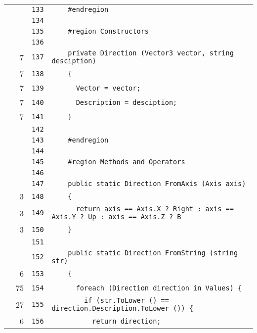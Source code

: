 \documentclass[a4paper,10pt]{article}
\begin{document}
\begin{longtable}[l]{lrrl}
\cellcolor{gray} &  & \verb~133~ & \verb~    #endregion~\\
\cellcolor{gray} &  & \verb~134~ & \verb~~\\
\cellcolor{gray} &  & \verb~135~ & \verb~    #region Constructors~\\
\cellcolor{gray} &  & \verb~136~ & \verb~~\\
\cellcolor{green} & 7 & \verb~137~ & \verb~    private Direction (Vector3 vector, string desciption)~\\
\cellcolor{green} & 7 & \verb~138~ & \verb~    {~\\
\cellcolor{green} & 7 & \verb~139~ & \verb~      Vector = vector;~\\
\cellcolor{green} & 7 & \verb~140~ & \verb~      Description = desciption;~\\
\cellcolor{green} & 7 & \verb~141~ & \verb~    }~\\
\cellcolor{gray} &  & \verb~142~ & \verb~~\\
\cellcolor{gray} &  & \verb~143~ & \verb~    #endregion~\\
\cellcolor{gray} &  & \verb~144~ & \verb~~\\
\cellcolor{gray} &  & \verb~145~ & \verb~    #region Methods and Operators~\\
\cellcolor{gray} &  & \verb~146~ & \verb~~\\
\cellcolor{gray} &  & \verb~147~ & \verb~    public static Direction FromAxis (Axis axis)~\\
\cellcolor{green} & 3 & \verb~148~ & \verb~    {~\\
\cellcolor{green} & 3 & \verb~149~ & \verb~      return axis == Axis.X ? Right : axis == Axis.Y ? Up : axis == Axis.Z ? B~\\
\cellcolor{green} & 3 & \verb~150~ & \verb~    }~\\
\cellcolor{gray} &  & \verb~151~ & \verb~~\\
\cellcolor{gray} &  & \verb~152~ & \verb~    public static Direction FromString (string str)~\\
\cellcolor{green} & 6 & \verb~153~ & \verb~    {~\\
\cellcolor{green} & 75 & \verb~154~ & \verb~      foreach (Direction direction in Values) {~\\
\cellcolor{green} & 27 & \verb~155~ & \verb~        if (str.ToLower () == direction.Description.ToLower ()) {~\\
\cellcolor{green} & 6 & \verb~156~ & \verb~          return direction;~\\

\end{longtable}
\end{document}

